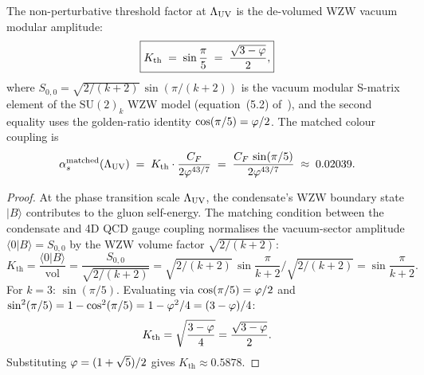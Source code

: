 \begin{theorem}
\label{P5:thm:Kth}
The non-perturbative threshold factor at $\Lambda_{\mathrm{UV}}$ is the de-volumed
WZW vacuum modular amplitude:
\begin{equation}
  \boxed{K_{\mathrm{th}}
  \;=\; \sin\frac{\pi}{5}
  \;=\; \frac{\sqrt{3-\varphi}}{2},}
  \label{P5:eq:Kth_exact}
\end{equation}
where $S_{0,0} = \sqrt{2/(k+2)}\,\sin(\pi/(k+2))$ is the vacuum
modular S-matrix element of the $\mathrm{SU}(2)_k$ WZW model
(equation~(5.2) of~\cite{Paper1,Verlinde1988}), and the second equality uses the
golden-ratio identity $\cos(\pi/5) = \varphi/2$.
The matched colour coupling is
\begin{equation}
  \alpha_s^{\mathrm{matched}}(\Lambda_{\mathrm{UV}})
  \;=\; K_{\mathrm{th}}\cdot\frac{C_F}{2\varphi^{43/7}}
  \;=\; \frac{C_F\,\sin(\pi/5)}{2\varphi^{43/7}}
  \;\approx\; 0.02039.
  \label{P5:eq:as_matched}
\end{equation}
\end{theorem}

\begin{proof}
At the phase transition scale $\Lambda_{\mathrm{UV}}$, the condensate's WZW boundary
state $|B\rangle$ contributes to the gluon self-energy. The matching
condition between the condensate and 4D QCD gauge coupling normalises
the vacuum-sector amplitude $\langle 0|B\rangle=S_{0,0}$ by the WZW
volume factor $\sqrt{2/(k+2)}$:
\begin{equation}
  K_{\mathrm{th}}
  = \frac{\langle 0|B\rangle}{\text{vol}}
  = \frac{S_{0,0}}{\sqrt{2/(k+2)}}
  = \sqrt{2/(k+2)}\,\sin\!\frac{\pi}{k+2}\Big/\sqrt{2/(k+2)}
  = \sin\!\frac{\pi}{k+2}.
  \label{P5:eq:Kth_proof}
\end{equation}
For $k=3$: $\sin(\pi/5)$. Evaluating via $\cos(\pi/5)=\varphi/2$ and
$\sin^2(\pi/5)=1-\cos^2(\pi/5)=1-\varphi^2/4=(3-\varphi)/4$:
\begin{equation}
  K_{\mathrm{th}}
  = \sqrt{\frac{3-\varphi}{4}}
  = \frac{\sqrt{3-\varphi}}{2}.
  \label{P5:eq:Kth_golden}
\end{equation}
Substituting $\varphi=(1+\sqrt{5})/2$ gives $K_{\mathrm{th}}\approx0.5878$.
\end{proof}

